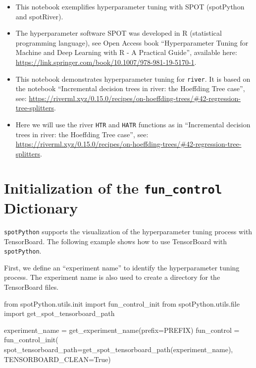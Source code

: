 \documentclass[
  letterpaper,
  DIV=11,
  numbers=noendperiod]{scrreprt}
\newenvironment{Shaded}{\begin{snugshade}}{\end{snugshade}}
\newcommand{\BuiltInTok}[1]{\textcolor[rgb]{0.00,0.23,0.31}{#1}}
\newcommand{\ImportTok}[1]{\textcolor[rgb]{0.00,0.46,0.62}{#1}}
\newcommand{\NormalTok}[1]{\textcolor[rgb]{0.00,0.23,0.31}{#1}}
\newcommand{\OperatorTok}[1]{\textcolor[rgb]{0.37,0.37,0.37}{#1}}
\newcommand{\VariableTok}[1]{\textcolor[rgb]{0.07,0.07,0.07}{#1}}
\providecommand{\tightlist}{%
  \setlength{\itemsep}{0pt}\setlength{\parskip}{0pt}}\usepackage{longtable,booktabs,array}
\begin{document}
\begin{itemize}
\tightlist
\item
  This notebook exemplifies hyperparameter tuning with SPOT (spotPython
  and spotRiver).
\item
  The hyperparameter software SPOT was developed in R (statistical
  programming language), see Open Access book ``Hyperparameter Tuning
  for Machine and Deep Learning with R - A Practical Guide'', available
  here: \url{https://link.springer.com/book/10.1007/978-981-19-5170-1}.
\item
  This notebook demonstrates hyperparameter tuning for \texttt{river}.
  It is based on the notebook ``Incremental decision trees in river: the
  Hoeffding Tree case'', see:
  \url{https://riverml.xyz/0.15.0/recipes/on-hoeffding-trees/\#42-regression-tree-splitters}.
\item
  Here we will use the river \texttt{HTR} and \texttt{HATR} functions as
  in ``Incremental decision trees in river: the Hoeffding Tree case'',
  see:
  \url{https://riverml.xyz/0.15.0/recipes/on-hoeffding-trees/\#42-regression-tree-splitters}.
\end{itemize}

\hypertarget{initialization-of-the-fun_control-dictionary}{%
\section{\texorpdfstring{Initialization of the \texttt{fun\_control}
Dictionary}{Initialization of the fun\_control Dictionary}}\label{initialization-of-the-fun_control-dictionary}}

\texttt{spotPython} supports the visualization of the hyperparameter
tuning process with TensorBoard. The following example shows how to use
TensorBoard with \texttt{spotPython}.

First, we define an ``experiment name'' to identify the hyperparameter
tuning process. The experiment name is also used to create a directory
for the TensorBoard files.

\begin{Shaded}
\begin{Highlighting}[]
\ImportTok{from}\NormalTok{ spotPython.utils.init }\ImportTok{import}\NormalTok{ fun\_control\_init}
\ImportTok{from}\NormalTok{ spotPython.utils.}\BuiltInTok{file} \ImportTok{import}\NormalTok{ get\_spot\_tensorboard\_path}

\NormalTok{experiment\_name }\OperatorTok{=}\NormalTok{ get\_experiment\_name(prefix}\OperatorTok{=}\NormalTok{PREFIX)}
\NormalTok{fun\_control }\OperatorTok{=}\NormalTok{ fun\_control\_init(}
\NormalTok{    spot\_tensorboard\_path}\OperatorTok{=}\NormalTok{get\_spot\_tensorboard\_path(experiment\_name),}
\NormalTok{    TENSORBOARD\_CLEAN}\OperatorTok{=}\VariableTok{True}\NormalTok{)}
\end{Highlighting}
\end{Shaded}
\end{document}
